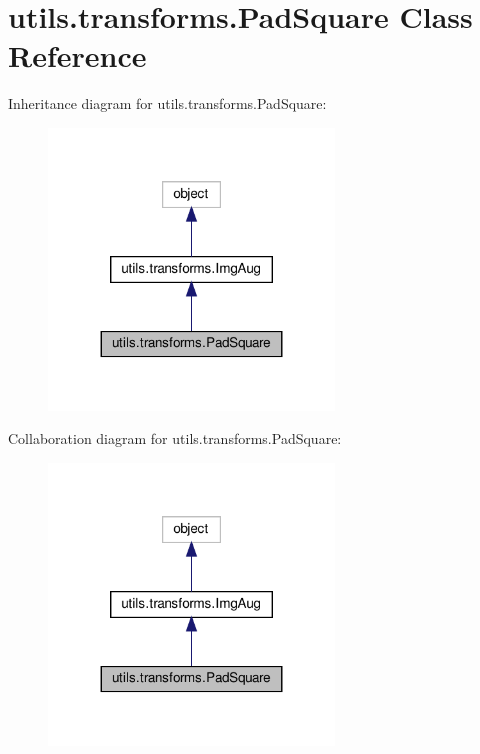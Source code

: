 \hypertarget{classutils_1_1transforms_1_1PadSquare}{}\section{utils.\+transforms.\+Pad\+Square Class Reference}
\label{classutils_1_1transforms_1_1PadSquare}


Inheritance diagram for utils.\+transforms.\+Pad\+Square\+:
\nopagebreak
\begin{figure}[H]
\begin{center}
\leavevmode
\includegraphics[width=215pt]{classutils_1_1transforms_1_1PadSquare__inherit__graph}
\end{center}
\end{figure}


Collaboration diagram for utils.\+transforms.\+Pad\+Square\+:
\nopagebreak
\begin{figure}[H]
\begin{center}
\leavevmode
\includegraphics[width=215pt]{classutils_1_1transforms_1_1PadSquare__coll__graph}
\end{center}
\end{figure}
